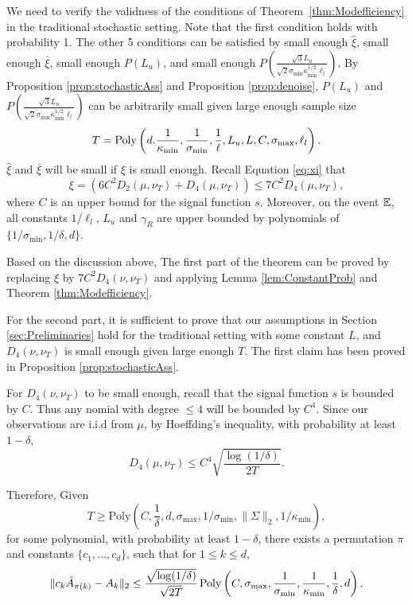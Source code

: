 We need to verify the validness of the conditions of Theorem~\ref{thm:Modefficiency} in the traditional stochastic setting. 
Note that the first condition holds with probability 1. 
The other 5 conditions can be satisfied by small enough 
$\hat{\xi}$, small enough $\bar{\xi}$, small enough $P(L_u)$, and small enough $P\left(\frac{\sqrt{3}L_u}{\sqrt{2}\sigma_{\min}\kappa_{\min}^{1/2}\ell_l}\right)$.
By Proposition \ref{prop:stochasticAss} and Proposition \ref{prop:denoise}, $P(L_u)$ and $P\left(\frac{\sqrt{3}L_u}{\sqrt{2}\sigma_{\min}\kappa_{\min}^{1/2}\ell_l}\right)$ can be arbitrarily small given large enough sample size 
\[T = \operatorname{Poly}\left(d.\frac{1}{\kappa_{\min}}, \frac{1}{\sigma_{\min}}, \frac{1}{\ell}, L_u, L, C, \sigma_{\max}, \ell_l\right).\] 
$\hat{\xi}$ and $\bar{\xi}$ will be small if $\xi$ is small enough.
Recall Equation \eqref{eq:xi} that 
\[\xi = \left( 6C^2D_2(\mu, \nu_T) + D_4(\mu, \nu_T)\right) \le 7C^2D_4(\mu, \nu_T),\]
where $C$ is an upper bound for the signal function $s$.
Moreover, on the event $\mathbb{E}$, all constants $1/\ell_l$, $L_u$ and $\gamma_R$ are upper bounded by polynomials of $\{ 1/\sigma_{\min}, 1/\delta, d\}$. 

Based on the discussion above, The first part of the theorem can be proved by replacing $\xi$ by $7C^2D_4(\nu,\nu_T)$ and applying Lemma \ref{lem:ConstantProb} and Theorem \ref{thm:Modefficiency}. 

For the second part, it is sufficient to prove that our assumptions in Section \ref{sec:Preliminaries} hold for the traditional setting with some constant $L$, and $D_4(\nu, \nu_T)$ is small enough given large enough $T$.
The first claim has been proved in Proposition \ref{prop:stochasticAss}. 

For $D_4(\nu, \nu_T)$ to be small enough, recall that the signal function $s$ is bounded by $C$. 
Thus any nomial with degree $\le 4$ will be bounded by $C^4$. Since our observations are i.i.d from $\mu$, by Hoeffding's inequality, with probability at least $1-\delta$, 
\[
D_4(\mu, \nu_T) \le  C^4\sqrt{\frac{\log(1/\delta)}{2T}}.
\]

Therefore, Given 
\[
T \ge \text{Poly}\left(C, \frac{1}{\delta}, d,  \sigma_{\max}, 1/\sigma_{\min}, \|\Sigma\|_2, 1/\kappa_{\min}\right),
\]
for some polynomial, with probability at least $1-\delta$, there exists a permutation $\pi$ and constants $\{c_1,\ldots,c_d\}$, such that for $1\le k\le d$,
\[
\| c_k\hat{A}_{\pi(k)} - A_k\|_2 \le \frac{\sqrt{\log(1/\delta)}}{\sqrt{2T}}\operatorname{Poly}\left(C, \sigma_{\max}, \frac{1}{\sigma_{\min}}, \frac{1}{\kappa_{\min}},\frac{1}{\delta}, d\right).
\]
\fi

